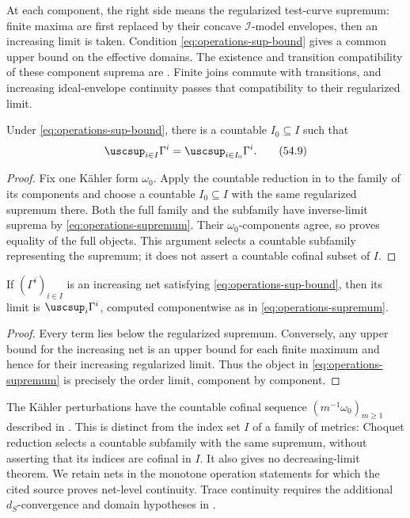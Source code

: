 At each component, the right side means the regularized test-curve
supremum: finite maxima are first replaced by their concave
$\mathcal I$-model envelopes, then an increasing limit is taken.
Condition \eqref{eq:operations-sup-bound} gives a common upper bound on
the effective domains.  The existence and transition compatibility of
these component suprema are .
Finite joins commute with transitions, and increasing ideal-envelope
continuity passes that compatibility to their regularized limit.

\begin{theorem}\label{thm:operations-choquet}
Under \eqref{eq:operations-sup-bound}, there is a countable
$I_0\subseteq I$ such that
\[
                   \uscsup_{i\in I}\Gamma^i
                   =\uscsup_{i\in I_0}\Gamma^i.
\tag{54.9}\label{eq:operations-choquet}
\]
\end{theorem}

\begin{proof}
Fix one K\"ahler form $\omega_0$.  Apply the countable reduction in
 to the family of its components and choose
a countable $I_0\subseteq I$ with the same regularized supremum there.
Both the full family and the subfamily have inverse-limit suprema by
\eqref{eq:operations-supremum}.  Their $\omega_0$-components agree,
so  proves equality of the full objects.
This argument selects a countable subfamily representing the supremum;
it does not assert a countable cofinal subset of $I$.
\end{proof}

\begin{corollary}\label{cor:operations-increasing-net}
If $(\Gamma^i)_{i\in I}$ is an increasing net satisfying
\eqref{eq:operations-sup-bound}, then its limit is
$\uscsup_i\Gamma^i$, computed componentwise as in
\eqref{eq:operations-supremum}.
\end{corollary}

\begin{proof}
Every term lies below the regularized supremum.  Conversely, any upper
bound for the increasing net is an upper bound for each finite maximum
and hence for their increasing regularized limit.  Thus the object in
\eqref{eq:operations-supremum} is precisely the order limit, component by
component.
\end{proof}

\begin{remark}
\label{rem:operations-nets}
The K\"ahler perturbations have the countable cofinal sequence
$(m^{-1}\omega_0)_{m\geq1}$ described in
.
This is distinct from the index set $I$ of a family of metrics:
Choquet reduction selects a countable subfamily with the same
supremum, without asserting that its indices are cofinal in $I$.
It also gives no decreasing-limit theorem.
We retain nets in the monotone operation statements for which
the cited source proves net-level continuity.
Trace continuity requires the additional $d_S$-convergence
and domain hypotheses in .
\end{remark}

